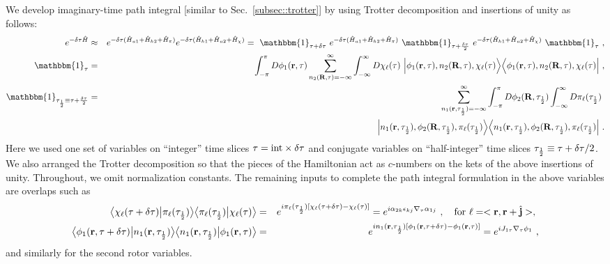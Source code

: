We develop imaginary-time path integral [similar to Sec.~\ref{subsec::trotter}] by using Trotter decomposition and insertions of unity as follows:
\begin{eqnarray*}
e^{-\delta\tau \hat{H}} &\approx& e^{-\delta\tau (\hat{H}_{u1} + \hat{H}_{h2} + \hat{H}_\pi)} e^{-\delta\tau (\hat{H}_{h1} + \hat{H}_{u2} + \hat{H}_\chi)}
= ~\mathbbm{1}_{\tau + \delta\tau}~ e^{-\delta\tau (\hat{H}_{u1} + \hat{H}_{h2} + \hat{H}_\pi)} ~\mathbbm{1}_{\tau + \frac{\delta\tau}{2}}~ e^{-\delta\tau (\hat{H}_{h1} + \hat{H}_{u2} + \hat{H}_\chi)} ~\mathbbm{1}_{\tau} ~,\\
\mathbbm{1}_{\tau} &=&
\int_{-\pi}^\pi D\phi_1(\br, \tau)
\sum_{n_2(\bR, \tau) = -\infty}^\infty
\int_{-\infty}^\infty D\chi_\ell(\tau) ~
\Big|   \phi_1(\br, \tau), n_2(\bR, \tau), \chi_\ell(\tau) \Big\ra
\Big\la \phi_1(\br, \tau), n_2(\bR, \tau), \chi_\ell(\tau) \Big| ~,\\
\mathbbm{1}_{\tau_\half \equiv \tau + \frac{\delta\tau}{2}} &=&
\sum_{n_1(\br, \tau_\half) = -\infty}^\infty
\int_{-\pi}^\pi D\phi_2(\bR, \tau_\half) 
\int_{-\infty}^\infty D\pi_\ell(\tau_\half) ~\\
&&\quad\Big|   n_1(\br, \tau_\half), \phi_2(\bR, \tau_\half), \pi_\ell(\tau_\half) \Big\ra
\Big\la n_1(\br, \tau_\half), \phi_2(\bR, \tau_\half), \pi_\ell(\tau_\half) \Big| ~.
\end{eqnarray*}
Here we used one set of variables on ``integer'' time slices $\tau = {\rm int} \times \delta\tau$ and conjugate variables on ``half-integer'' time slices $\tau_{\frac{1}{2}} \equiv \tau + \delta\tau/2$.  We also arranged the Trotter decomposition so that the pieces of the Hamiltonian act as $c$-numbers on the kets of the above insertions of unity.  Throughout, we omit normalization constants.  The remaining inputs to complete the path integral formulation in the above variables are overlaps such as
\begin{eqnarray}
\big\langle \chi_\ell(\tau + \delta\tau) \big| \pi_\ell(\tau_{\frac{1}{2}}) \big\rangle
\big\langle \pi_\ell(\tau_{\frac{1}{2}}) \big| \chi_\ell(\tau) \big\rangle &=& e^{i \pi_\ell(\tau_{\frac{1}{2}}) [\chi_\ell(\tau + \delta\tau) - \chi_\ell(\tau)]}
= e^{i \alpha_{2k} \epsilon_{kj} \nabla_\tau \alpha_{1j}} ~,
\quad {\rm for~} \ell = <{\bf r}, {\bf r}+\hat{{\bf j}}>, ~ \nonumber\\
\big\langle \phi_1({\bf r}, \tau + \delta\tau) \big| n_1({\bf r}, \tau_{\frac{1}{2}}) \big\rangle
\big\langle n_1({\bf r}, \tau_{\frac{1}{2}}) \big| \phi_1({\bf r}, \tau) \big\rangle &=&
e^{i n_1({\bf r}, \tau_{\frac{1}{2}}) [\phi_1({\bf r}, \tau + \delta\tau) - \phi_1({\bf r}, \tau)]}
= e^{i J_{1\tau} \nabla_\tau \phi_1} ~,
\end{eqnarray}
and similarly for the second rotor variables.

